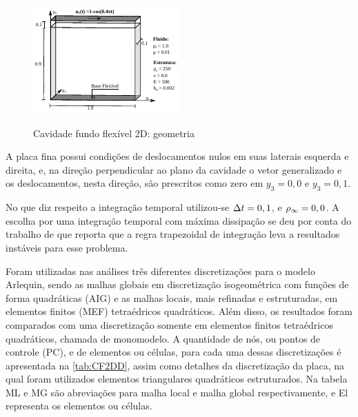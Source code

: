 \begin{figure}[!htbp]
	\caption{Cavidade fundo flexível 2D: geometria}
	\centering 
	\includegraphics[scale=2.5,trim=0cm 0cm 0cm 0cm, clip=true]{Imagens/Cap7/cavFF2d_geometria.pdf}	
	\label{fig:cavFF2d_geometria}
\end{figure}

A placa fina possui condições de deslocamentos nulos em suas laterais esquerda e direita, e, na direção perpendicular ao plano da cavidade o vetor generalizado e os deslocamentos, nesta direção, são prescritos como zero em $y_3=0,0$ e $y_3=0,1$.

No que diz respeito a integração temporal utilizou-se $\Delta t = 0,1$, e $\rho_\infty = 0,0$. A escolha por uma integração temporal com máxima dissipação se deu por conta do trabalho de  que reporta que a regra trapezoidal de integração leva a resultados instáveis para esse problema.

Foram utilizadas nas análises três diferentes discretizações para o modelo Arlequin, sendo as malhas globais em discretização isogeométrica com funções de forma quadráticas (AIG) e as malhas locais, mais refinadas e estruturadas, em elementos finitos (MEF) tetraédricos quadráticos. Além disso, os resultados foram comparados com uma discretização somente em elementos finitos tetraédricos quadráticos, chamada de monomodelo. A quantidade de nós, ou pontos de controle (PC), e de elementos ou células, para cada uma dessas discretizações é apresentada na \autoref{tab:CF2DD}, assim como detalhes da discretização da placa, na qual foram utilizados elementos triangulares quadráticos estruturados. Na tabela ML e MG são abreviações para malha local e malha global respectivamente, e El representa os elementos ou células.
	
